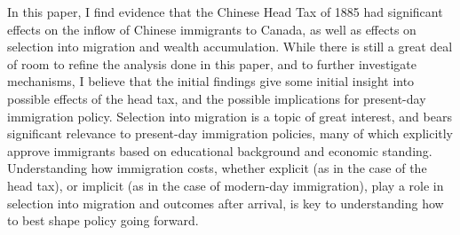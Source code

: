 \documentclass[12pt]{article}
\begin{document}
In this paper, I find evidence that the Chinese Head Tax of 1885 had significant effects on the inflow of Chinese immigrants to Canada, as well as effects on selection into migration and wealth accumulation. While there is still a great deal of room to refine the analysis done in this paper, and to further investigate mechanisms, I believe that the initial findings give some initial insight into possible effects of the head tax, and the possible implications for present-day immigration policy. Selection into migration is a topic of great interest, and bears significant relevance to present-day immigration policies, many of which explicitly approve immigrants based on educational background and economic standing. Understanding how immigration costs, whether explicit (as in the case of the head tax), or implicit (as in the case of modern-day immigration), play a role in selection into migration and outcomes after arrival, is key to understanding how to best shape policy going forward. 


\newpage


\end{document}
